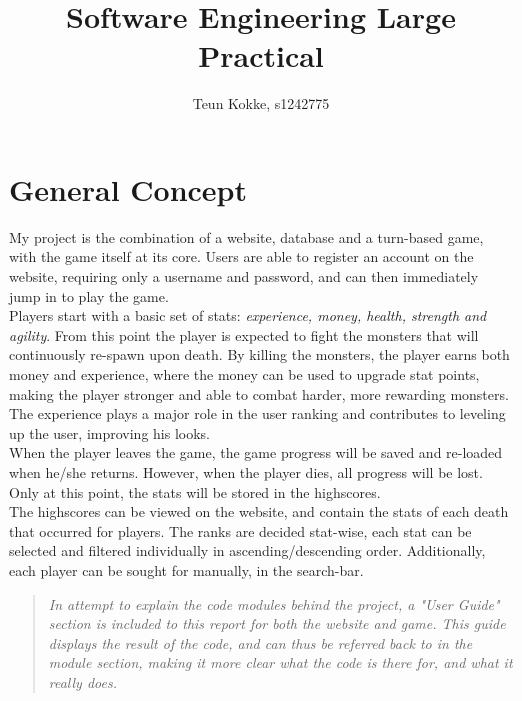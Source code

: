 \documentclass[12pt]{report}
\author{Teun Kokke, s1242775}
\begin{document}
\begin{titlepage}

\end{titlepage}

\title
{
	\vspace*{\dimexpr-4.4in-\topmargin-\headsep-\headheight-\baselineskip}%
	\hspace*{\dimexpr-1.2in-\evensidemargin-\parindent}%
    Software Engineering Large Practical
}
\maketitle

\section*{General Concept}
My project is the combination of a website, database and a turn-based game, with the game itself at its core. Users are able to register an account on the website, requiring only a username and password, and can then immediately jump in to play the game.\\
Players start with a basic set of stats: \textit{experience, money, health, strength and agility}. From this point the player is expected to fight the monsters that will continuously re-spawn upon death. By killing the monsters, the player earns both money and experience, where the money can be used to upgrade stat points, making the player stronger and able to combat harder, more rewarding monsters. The experience plays a major role in the user ranking and contributes to leveling up the user, improving his looks.\\
When the player leaves the game, the game progress will be saved and re-loaded when he/she returns. However, when the player dies, all progress will be lost. Only at this point, the stats will be stored in the highscores.\\
The highscores can be viewed on the website, and contain the stats of each death that occurred for players. The ranks are decided stat-wise, each stat can be selected and filtered individually in ascending/descending order. Additionally, each player can be sought for manually, in the search-bar.
\vspace{2em}
\begin{quote}
\textit{In attempt to explain the code modules behind the project, a "User Guide" section is included to this report for both the website and game. This guide displays the result of the code, and can thus be referred back to in the module section, making it more clear what the code is there for, and what it really does.}
\end{quote}
\pagebreak
\end{document}
